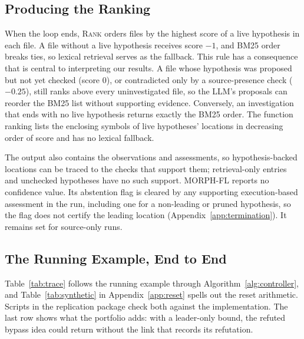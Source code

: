\documentclass[a4paper,fleqn]{cas-sc}
\newcommand{\tool}{MORPH-FL}
\begin{document}
\subsection{Producing the Ranking}\label{sec:output}
When the loop ends, \textsc{Rank} orders files by the highest score of a live hypothesis in each file. A file without a live hypothesis receives score $-1$, and BM25 order breaks ties, so lexical retrieval serves as the fallback. This rule has a consequence that is central to interpreting our results. A file whose hypothesis was proposed but not yet checked (score 0), or contradicted only by a source-presence check ($-0.25$), still ranks above every uninvestigated file, so the LLM's proposals can reorder the BM25 list without supporting evidence. Conversely, an investigation that ends with no live hypothesis returns exactly the BM25 order. The function ranking lists the enclosing symbols of live hypotheses' locations in decreasing order of score and has no lexical fallback.

The output also contains the observations and assessments, so hypothesis-backed locations can be traced to the checks that support them; retrieval-only entries and unchecked hypotheses have no such support. \tool{} reports no confidence value. Its abstention flag is cleared by any supporting execution-based assessment in the run, including one for a non-leading or pruned hypothesis, so the flag does not certify the leading location (Appendix~\ref{app:termination}). It remains set for source-only runs.

\subsection{The Running Example, End to End}\label{sec:trace}
Table~\ref{tab:trace} follows the running example through Algorithm~\ref{alg:controller}, and Table~\ref{tab:synthetic} in Appendix~\ref{app:reset} spells out the reset arithmetic. Scripts in the replication package check both against the implementation. The last row shows what the portfolio adds: with a leader-only bound, the refuted bypass idea could return without the link that records its refutation.
\end{document}

